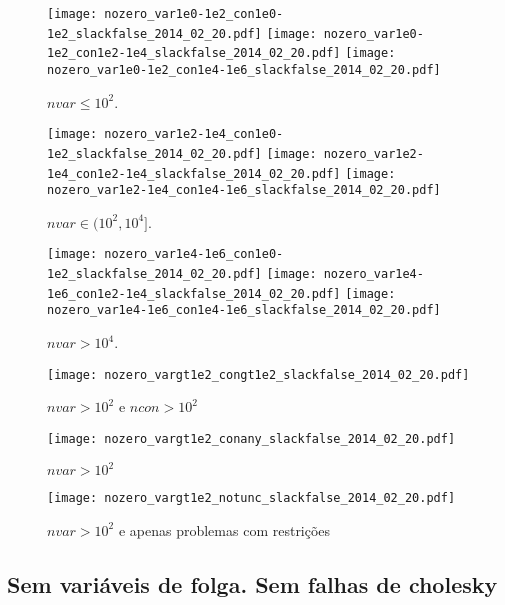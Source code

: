 \documentclass{article}
\begin{document}
\begin{figure}[H]
\centering
\texttt{[image: nozero\_var1e0-1e2\_con1e0-1e2\_slackfalse\_2014\_02\_20.pdf]}
\texttt{[image: nozero\_var1e0-1e2\_con1e2-1e4\_slackfalse\_2014\_02\_20.pdf]}
\texttt{[image: nozero\_var1e0-1e2\_con1e4-1e6\_slackfalse\_2014\_02\_20.pdf]}
\caption{ $nvar \leq 10^2$. }
\label{fig:nvar_small}
\end{figure}
\begin{figure}[H]
\centering
\texttt{[image: nozero\_var1e2-1e4\_con1e0-1e2\_slackfalse\_2014\_02\_20.pdf]}
\texttt{[image: nozero\_var1e2-1e4\_con1e2-1e4\_slackfalse\_2014\_02\_20.pdf]}
\texttt{[image: nozero\_var1e2-1e4\_con1e4-1e6\_slackfalse\_2014\_02\_20.pdf]}
\caption{ $nvar \in (10^2,10^4]$. }
\label{fig:nvar_medium}
\end{figure}
\begin{figure}[H]
\centering
\texttt{[image: nozero\_var1e4-1e6\_con1e0-1e2\_slackfalse\_2014\_02\_20.pdf]}
\texttt{[image: nozero\_var1e4-1e6\_con1e2-1e4\_slackfalse\_2014\_02\_20.pdf]}
\texttt{[image: nozero\_var1e4-1e6\_con1e4-1e6\_slackfalse\_2014\_02\_20.pdf]}
\caption{ $nvar > 10^4$. }
\label{fig:nvar_big}
\end{figure}

\begin{figure}[H]
\centering
\texttt{[image: nozero\_vargt1e2\_congt1e2\_slackfalse\_2014\_02\_20.pdf]}
\caption{ $nvar > 10^2$ e $ncon > 10^2$ }
\label{fig:both_medium_and_big}
\end{figure}

\begin{figure}[H]
\centering
\texttt{[image: nozero\_vargt1e2\_conany\_slackfalse\_2014\_02\_20.pdf]}
\caption{ $nvar > 10^2$ }
\label{fig:nvar_medium_and_big}
\end{figure}

\begin{figure}[H]
\centering
\texttt{[image: nozero\_vargt1e2\_notunc\_slackfalse\_2014\_02\_20.pdf]}
\caption{ $nvar > 10^2$ e apenas problemas com restrições }
\label{fig:nvar_medium_and_big_not_unc}
\end{figure}

\newpage
\subsection{Sem variáveis de folga. Sem falhas de cholesky}
\end{document}
